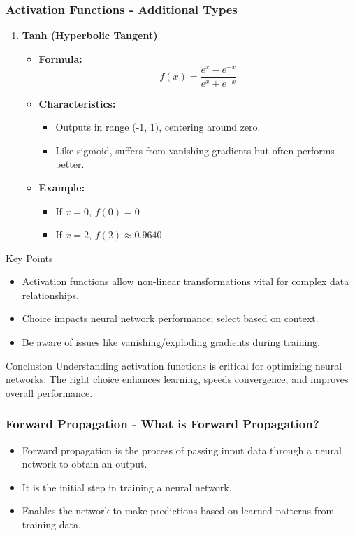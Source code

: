 \documentclass[aspectratio=169]{beamer}
\begin{document}
\begin{frame}[fragile]
  \frametitle{Activation Functions - Additional Types}
  \begin{enumerate}[resume]
    \item \textbf{Tanh (Hyperbolic Tangent)}
      \begin{itemize}
        \item \textbf{Formula:}
        \[
        f(x) = \frac{e^{x} - e^{-x}}{e^{x} + e^{-x}}
        \]
        \item \textbf{Characteristics:}
        \begin{itemize}
          \item Outputs in range (-1, 1), centering around zero.
          \item Like sigmoid, suffers from vanishing gradients but often performs better.
        \end{itemize}
        \item \textbf{Example:}
        \begin{itemize}
          \item If \( x = 0 \), \( f(0) = 0 \)
          \item If \( x = 2 \), \( f(2) \approx 0.9640 \)
        \end{itemize}
      \end{itemize}
  \end{enumerate}
  
  \begin{block}{Key Points}
    \begin{itemize}
      \item Activation functions allow non-linear transformations vital for complex data relationships.
      \item Choice impacts neural network performance; select based on context.
      \item Be aware of issues like vanishing/exploding gradients during training.
    \end{itemize}
  \end{block}
  
  \begin{block}{Conclusion}
    Understanding activation functions is critical for optimizing neural networks. The right choice enhances learning, speeds convergence, and improves overall performance.
  \end{block}
\end{frame}

\begin{frame}[fragile]
    \frametitle{Forward Propagation - What is Forward Propagation?}
    \begin{itemize}
        \item Forward propagation is the process of passing input data through a neural network to obtain an output.
        \item It is the initial step in training a neural network.
        \item Enables the network to make predictions based on learned patterns from training data.
    \end{itemize}
\end{frame}
\end{document}
